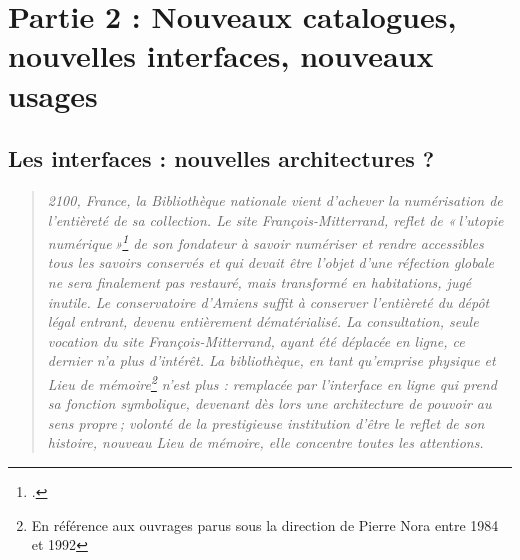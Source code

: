 


\part{Partie 2 : Nouveaux catalogues, nouvelles interfaces, nouveaux usages}




\chapter{Les interfaces : nouvelles architectures ?}
\begin{quote}
	\textit{2100, France, la Bibliothèque nationale vient d’achever la numérisation de l’entièreté de sa collection. Le site François-Mitterrand, reflet de « l’utopie numérique »\footcite[p. 20]{bermes2024} de son fondateur à savoir numériser et rendre accessibles tous les savoirs conservés et qui devait être l’objet d’une réfection globale ne sera finalement pas restauré, mais transformé en habitations, jugé inutile. Le conservatoire d’Amiens suffit à conserver l’entièreté du dépôt légal entrant, devenu entièrement dématérialisé. La consultation, seule vocation du site François-Mitterrand, ayant été déplacée en ligne, ce dernier n'a plus d'intérêt. La bibliothèque, en tant qu’emprise physique et Lieu de mémoire\footnote{En référence aux ouvrages parus sous la direction de Pierre Nora entre 1984 et 1992} n’est plus : remplacée par l’interface en ligne qui prend sa fonction symbolique, devenant dès lors une architecture de pouvoir au sens propre ; volonté de la prestigieuse institution d’être le reflet de son histoire, nouveau Lieu de mémoire, elle concentre toutes les attentions.}
\end{quote}


